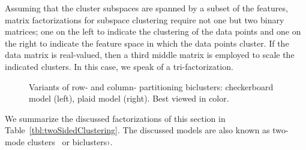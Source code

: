 Assuming that the cluster subspaces are spanned by a subset of the features, matrix factorizations for subspace clustering require not one but two binary matrices; one on the left to indicate the clustering of the data points and one on the right to indicate the feature space in which the data points cluster. If the data matrix is real-valued, then a third middle matrix is employed to scale the indicated clusters. In this case, we speak of a tri-factorization.  
\begin{figure}
    \centering
    
    \caption{Variants of row- and column- partitioning biclusters: checkerboard model (left), plaid model (right). Best viewed in color. }
    \label{fig:blockclusters}
\end{figure}
\begin{table}%
	\centering
    \caption{Overview of objective functions proposed for two-sided clustering}
\label{tbl:twoSidedClustering}
\end{table}
We summarize the discussed factorizations of this section in Table~\ref{tbl:twoSidedClustering}. The discussed models are also known as two-mode clusters~\citep{van2004two,van2009optimization} or biclusters›\citep{busygin2008biclustering}.
